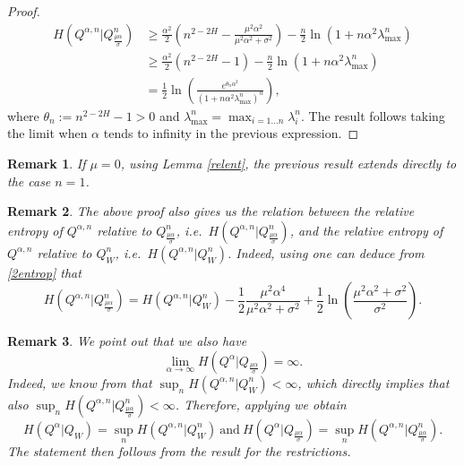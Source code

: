 \documentclass[reqno,a4paper]{amsart}
\theoremstyle{plain}
\theoremstyle{definition}
\theoremstyle{plain}
\theoremstyle{plain}
\newtheorem{remark}{Remark}
\theoremstyle{plain}
\begin{document}
\begin{proof}
\begin{align}\label{lowb1}
 H\left(Q^{\alpha,n}|Q_{\frac{\mu\alpha}{\sigma}}^n\right)&\geq\frac{\alpha^2}2\left(n^{2-2H}-\frac{\mu^2\alpha^2}{\mu^2\alpha^2+\sigma^2}\right)-\frac{n}2 \ln(1+n\alpha^2\lambda_{\text{max}}^n)\nonumber\\
 &\geq\frac{\alpha^2}2(n^{2-2H}-1)-\frac{n}2 \ln(1+n\alpha^2\lambda_{\text{max}}^n)\nonumber\\
 &=\frac12\ln\left(\frac{e^{\theta_n\alpha^2}}{(1+n\alpha^2\lambda_{\text{max}}^n)^n}\right),
\end{align}
where $\theta_n:=n^{2-2H}-1>0$ and $\lambda_{\text{max}}^n=\max_{i=1\ldots n}\lambda_i^n$. The result follows taking the limit when $\alpha$ tends to infinity in the previous expression.
\end{proof}
\begin{remark}\label{rmk0}
 If $\mu=0$, using Lemma \ref{relent}, the previous result extends directly to the case $n=1$.
\end{remark}

\begin{remark}\label{rmk1}
The above proof also gives us the relation between the relative entropy of $Q^{\alpha,n}$ relative to $Q_{\frac{\mu\alpha}{\sigma}}^n$, i.e.~$H\left(Q^{\alpha,n}|Q_{\frac{\mu\alpha}{\sigma}}^n\right)$, and the relative entropy of $Q^{\alpha,n}$ relative to $Q_W^n$, i.e.~$H\left(Q^{\alpha,n}|Q_W^n\right)$. Indeed, using \cite[Lemma 5.3]{Ch1} one can deduce from \eqref{2entrop} that
\begin{equation}\label{rmkeq}
H\left(Q^{\alpha,n}|Q_{\frac{\mu\alpha}{\sigma}}^n\right)=H\left(Q^{\alpha,n}|Q_W^n\right)-\frac12\frac{\mu^2\alpha^4}{\mu^2\alpha^2+\sigma^2}+\frac12\ln\left(\frac{\mu^2\alpha^2+\sigma^2}{\sigma^2}\right).
\end{equation}
\end{remark}

\begin{remark}
We point out that we also have $$\lim\limits_{\alpha\rightarrow\infty}H\left(Q^{\alpha}|Q_{\frac{\mu\alpha}{\sigma}}\right)=\infty.$$
Indeed, we know from \cite[Lemma 5.3]{Ch1} that $\sup_n H\left(Q^{\alpha,n}|Q_W^n\right)<\infty$, which directly implies that also $\sup_n H\left(Q^{\alpha,n}|Q_{\frac{\mu\alpha}{\sigma}}^n\right)<\infty$. Therefore, applying \cite[Lemma 6.3]{Hihi} we obtain
$$H\left(Q^{\alpha}|Q_W\right)=\sup_nH\left(Q^{\alpha,n}|Q_W^n\right)\ \text{and}\ H\left(Q^{\alpha}|Q_{\frac{\mu\alpha}{\sigma}}\right)=\sup_nH\left(Q^{\alpha,n}|Q_{\frac{\mu\alpha}{\sigma}}^n\right).$$
The statement then follows from the result for the restrictions.
\end{remark}
\end{document}
